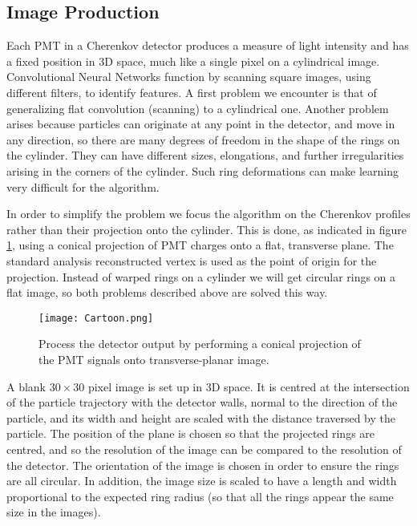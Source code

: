 \documentclass[twoside,twocolumn]{article}
\begin{document}
\subsection{Image Production}

Each PMT in a Cherenkov detector produces a measure of light intensity and has a fixed position in 3D space, much like a single pixel on a cylindrical image. Convolutional Neural Networks function by scanning square images, using different filters, to identify features. A first problem we encounter is that of generalizing flat convolution (scanning) to a cylindrical one. Another problem arises because particles can originate at any point in the detector, and move in any direction, so there are many degrees of freedom in the shape of the rings on the cylinder. They can have different sizes, elongations, and further irregularities arising in the corners of the cylinder. Such ring deformations can make learning very difficult for the algorithm.

In order to simplify the problem we focus the algorithm on the Cherenkov profiles rather than their projection onto the cylinder. This is done, as indicated in figure \ref{fig:Cartoon}, using a conical projection of PMT charges onto a flat, transverse plane. The standard analysis reconstructed vertex is used as the point of origin for the projection. Instead of warped rings on a cylinder we will get circular rings on a flat image, so both problems described above are solved this way.

\begin{figure}[ht]
    \centering
    \texttt{[image: Cartoon.png]}
    \caption{Process the detector output by performing a conical projection of the PMT signals onto transverse-planar image.}
    \label{fig:Cartoon}
\end{figure}

A blank $30\times 30$ pixel image is set up in 3D space. It is centred at the intersection of the particle trajectory with the detector walls, normal to the direction of the particle, and its width and height are scaled with the distance traversed by the particle. The position of the plane is chosen so that the projected rings are centred, and so the resolution of the image can be compared to the resolution of the detector. The orientation of the image is chosen in order to ensure the rings are all circular. In addition, the image size is scaled to have a length and width proportional to the expected ring radius (so that all the rings appear the same size in the images).
\end{document}
